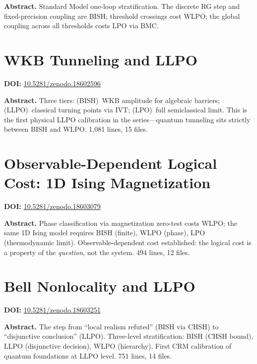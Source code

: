 \documentclass[11pt,a4paper]{article}
\begin{document}
\bigskip
\noindent\textbf{Abstract.}
Standard Model one-loop stratification. The discrete RG step and fixed-precision coupling are BISH; threshold crossings cost WLPO; the global coupling across all thresholds costs LPO via BMC.

\section{WKB Tunneling and LLPO}
\label{sec:p19}
\textbf{DOI:} \href{https://doi.org/10.5281/zenodo.18602596}{10.5281/zenodo.18602596}

\bigskip
\noindent\textbf{Abstract.}
Three tiers: (BISH)~WKB amplitude for algebraic barriers; (LLPO)~classical turning points via IVT; (LPO)~full semiclassical limit. This is the first physical LLPO calibration in the series---quantum tunneling sits strictly between BISH and WLPO. 1,081 lines, 15 files.

\section{Observable-Dependent Logical Cost: 1D Ising Magnetization}
\label{sec:p20}
\textbf{DOI:} \href{https://doi.org/10.5281/zenodo.18603079}{10.5281/zenodo.18603079}

\bigskip
\noindent\textbf{Abstract.}
Phase classification via magnetization zero-test costs WLPO; the same 1D Ising model requires BISH (finite), WLPO (phase), LPO (thermodynamic limit). Observable-dependent cost established: the logical cost is a property of the \emph{question}, not the system. 494 lines, 12 files.

\section{Bell Nonlocality and LLPO}
\label{sec:p21}
\textbf{DOI:} \href{https://doi.org/10.5281/zenodo.18603251}{10.5281/zenodo.18603251}

\bigskip
\noindent\textbf{Abstract.}
The step from ``local realism refuted'' (BISH via CHSH) to ``disjunctive conclusion'' (LLPO). Three-level stratification: BISH (CHSH bound), LLPO (disjunctive decision), WLPO (hierarchy). First CRM calibration of quantum foundations at LLPO level. 751 lines, 14 files.
\end{document}
